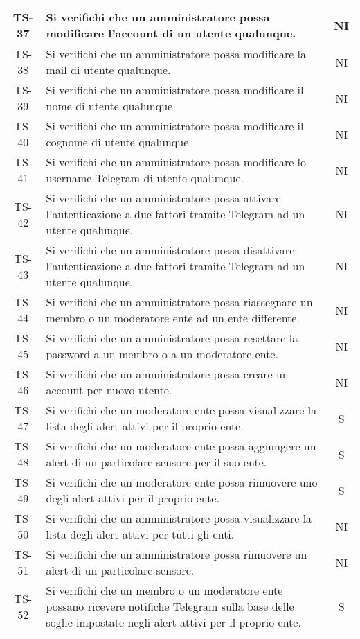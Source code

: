 \begin{center}
\begin{longtable}{|c|p{10cm}|c|}
			 TS-37 & Si verifichi che un amministratore possa modificare l'account di un utente qualunque. & NI \\
			 \hline
			 TS-38 & Si verifichi che un amministratore possa modificare la mail di utente qualunque. & NI \\
			 \hline
			 TS-39 & Si verifichi che un amministratore possa modificare il nome di utente qualunque. & NI \\
			 \hline
			 TS-40 & Si verifichi che un amministratore possa modificare il cognome di utente qualunque. & NI \\
			 \hline
			 TS-41 & Si verifichi che un amministratore possa modificare lo username Telegram di utente qualunque. & NI \\
			 \hline
			 TS-42 & Si verifichi che un amministratore possa attivare l'autenticazione a due fattori tramite Telegram ad un utente qualunque. & NI \\
			 \hline
			 TS-43 & Si verifichi che un amministratore possa disattivare l'autenticazione a due fattori tramite Telegram ad un utente qualunque. & NI \\
			 \hline
			 TS-44 & Si verifichi che un amministratore possa riassegnare un membro o un moderatore ente ad un ente differente. & NI \\
			 \hline
			 TS-45 & Si verifichi che un amministratore possa resettare la password a un membro o a un moderatore ente. & NI \\
			 \hline
			 TS-46 & Si verifichi che un amministratore possa creare un account per nuovo utente. & NI \\
			 \hline
			 TS-47 & Si verifichi che un moderatore ente possa visualizzare la lista degli alert attivi per il proprio ente. & S \\
			 \hline
			 TS-48 & Si verifichi che un moderatore ente possa aggiungere un alert di un particolare sensore per il suo ente. & S \\
			 \hline
			 TS-49 & Si verifichi che un moderatore ente possa rimuovere uno degli alert attivi per il proprio ente. & S \\
			 \hline
			 TS-50 & Si verifichi che un amministratore possa visualizzare la lista degli alert attivi per tutti gli enti. & NI \\
			 \hline
			 TS-51 & Si verifichi che un amministratore possa rimuovere un alert di un particolare sensore. & NI \\
			 \hline
			 TS-52 & Si verifichi che un membro o un moderatore ente possano ricevere notifiche Telegram sulla base delle soglie impostate negli alert attivi per il proprio ente. & S \\

\end{longtable}
\end{center}
